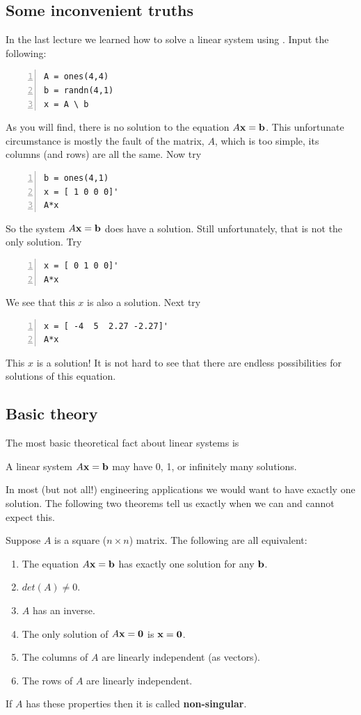 
\subsection*{Some inconvenient truths}


In the last lecture we learned how to solve a linear system
using .
Input the following:
\begin{lstlisting}[frame=none,numbers=left]
A = ones(4,4)
b = randn(4,1)
x = A \ b
\end{lstlisting}

As you will find, there is no solution to the equation $A \mathbf{x} = \mathbf{b}$.
This unfortunate circumstance is mostly the fault of the matrix, $A$,
which is too simple, its columns (and rows) are all the same.
Now try
\begin{lstlisting}[frame=none,numbers=left]
b = ones(4,1)
x = [ 1 0 0 0]'
A*x
\end{lstlisting}
So the system $A \mathbf{x} = \mathbf{b}$ does have a solution. Still unfortunately,
that is not the only solution. Try
\begin{lstlisting}[frame=none,numbers=left]
x = [ 0 1 0 0]'
A*x
\end{lstlisting}
We see that this $x$ is also a solution. Next try
\begin{lstlisting}[frame=none,numbers=left]
x = [ -4  5  2.27 -2.27]'
A*x
\end{lstlisting}
This $x$ is a solution! It is not hard to see that
there are endless possibilities for solutions of this
equation.


\subsection*{Basic theory}


The most basic theoretical fact about linear systems is
\begin{thm}
A linear system $A\mathbf{x} = \mathbf{b}$ may have 0, 1, or infinitely many solutions.
\end{thm}
In most (but not all!) engineering applications we would want to
have exactly one solution. The following two theorems tell us
exactly when we can and cannot expect this.
\begin{thm}
Suppose $A$ is a square ($n \times n $) matrix.
The following are all equivalent:
\begin{enumerate}
\item The equation $A\mathbf{x} = \mathbf{b}$ has exactly one solution for any $\mathbf{b}$.
\item $det(A) \ne 0$.
\item $A$ has an inverse.
\item The only solution of $A\mathbf{x} = \mathbf{0}$ is $\mathbf{x} = \mathbf{0}$.
\item The columns of $A$ are linearly independent (as vectors).
\item The rows of $A$ are linearly independent.
\end{enumerate}
If $A$ has these properties then it is called {\bf non-singular}.
\end{thm}

